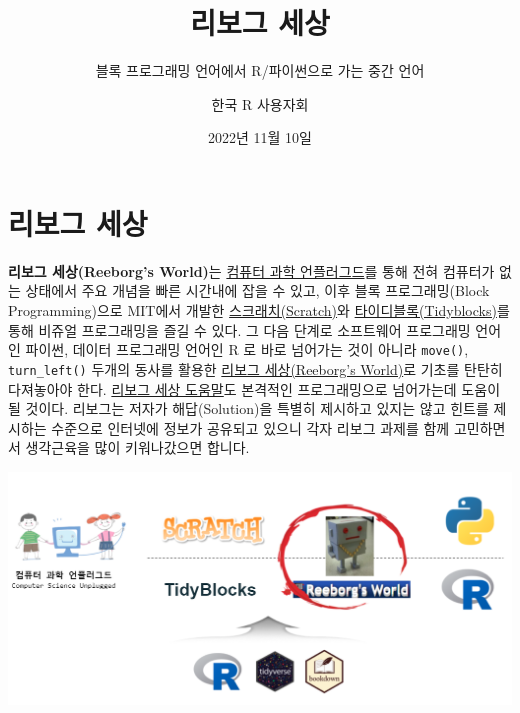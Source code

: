\documentclass[
  b5paperpaper,
  DIV=11,
  numbers=noendperiod]{scrreprt}
\title{리보그 세상}
\subtitle{블록 프로그래밍 언어에서 R/파이썬으로 가는 중간 언어}
\author{한국 R 사용자회}
\date{2022년 11월 10일}
\renewcommand*\contentsname{목차}
\newcommand\contentsname{목차}
\begin{document}
\maketitle
\ifdefined\Shaded\renewenvironment{Shaded}{\begin{tcolorbox}[interior hidden, sharp corners, boxrule=0pt, borderline west={3pt}{0pt}{shadecolor}, enhanced, breakable, frame hidden]}{\end{tcolorbox}}\fi

\renewcommand*\contentsname{목차}
{
\hypersetup{linkcolor=}
\setcounter{tocdepth}{2}
\tableofcontents
}

\hypertarget{reeborg}{%
\chapter*{리보그 세상}\label{reeborg}}


\textbf{리보그 세상(Reeborg's World)}는
\href{https://statkclee.github.io/unplugged/}{컴퓨터 과학 언플러그드}를
통해 전혀 컴퓨터가 없는 상태에서 주요 개념을 빠른 시간내에 잡을 수 있고,
이후 블록 프로그래밍(Block Programming)으로 MIT에서 개발한
\href{https://scratch.mit.edu/}{스크래치(Scratch)}와
\href{https://tidyblocks.tech/}{타이디블록(Tidyblocks)}를 통해 비쥬얼
프로그래밍을 즐길 수 있다. 그 다음 단계로 소프트웨어 프로그래밍 언어인
파이썬, 데이터 프로그래밍 언어인 R 로 바로 넘어가는 것이 아니라
\texttt{move()}, \texttt{turn\_left()} 두개의 동사를 활용한
\href{https://reeborg.ca/}{리보그 세상(Reeborg's World)}로 기초를 탄탄히
다져놓아야 한다. \href{https://reeborg.ca/docs/ko/}{리보그 세상
도움말}도 본격적인 프로그래밍으로 넘어가는데 도움이 될 것이다. 리보그는
저자가 해답(Solution)을 특별히 제시하고 있지는 않고 힌트를 제시하는
수준으로 인터넷에 정보가 공유되고 있으니 각자 리보그 과제를 함께
고민하면서 생각근육을 많이 키워나갔으면 합니다.

\includegraphics[width=6.65625in,height=\textheight]{./fig/reeborg-project.png}
\end{document}
